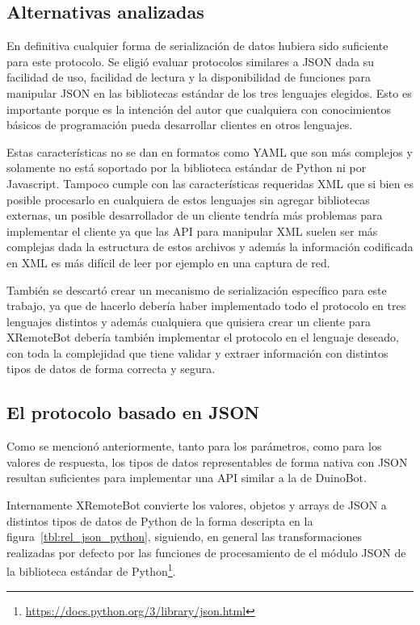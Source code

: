 \subsection{Alternativas analizadas}\label{sec:alternativas}
En definitiva cualquier forma de serialización de datos hubiera
sido suficiente para este protocolo. Se eligió evaluar protocolos
similares a JSON dada su facilidad de uso, facilidad de lectura
y la disponibilidad
de funciones para manipular JSON en las bibliotecas estándar
de los tres lenguajes elegidos. Esto es importante porque es
la intención del autor que cualquiera con conocimientos básicos
de programación pueda desarrollar clientes en otros lenguajes.

Estas características no se dan en formatos como YAML que
son más complejos y solamente no está soportado por la biblioteca
estándar de Python ni por Javascript. Tampoco cumple con las características
requeridas XML que si bien es posible
procesarlo en cualquiera de estos lenguajes sin agregar bibliotecas
externas, un posible desarrollador de un cliente tendría más
problemas para implementar el cliente ya que las API para
manipular XML suelen
ser más complejas dada la estructura de estos archivos y además
la información codificada en XML es más difícil de leer por
ejemplo en una captura de red.

También se descartó crear un mecanismo de serialización específico
para este trabajo, ya que de hacerlo debería haber implementado
todo el protocolo en tres lenguajes distintos y además cualquiera
que quisiera crear un cliente para XRemoteBot debería también
implementar el protocolo en el lenguaje deseado, con toda
la complejidad que tiene validar y extraer información con
distintos tipos de datos de forma correcta y segura.

\subsection{El protocolo basado en JSON}

Como se mencionó anteriormente, tanto para los parámetros, como para los valores de respuesta, los tipos
de datos representables de forma nativa con JSON resultan suficientes para
implementar una API similar a la de DuinoBot.

Internamente XRemoteBot
convierte los valores, objetos y arrays de JSON a distintos tipos de
datos de Python de la forma descripta en la
figura~\ref{tbl:rel_json_python}, siguiendo, en general las transformaciones
realizadas por defecto por las funciones de procesamiento de el módulo
JSON de la biblioteca estándar de
Python\footnote{\url{https://docs.python.org/3/library/json.html}}.

